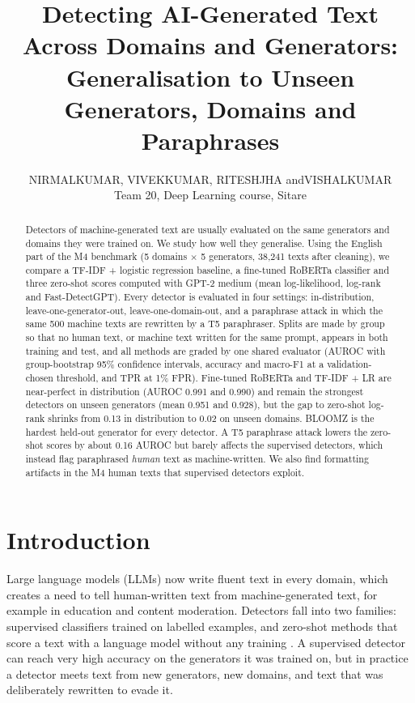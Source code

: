 \documentclass{nle}
\title[Detecting AI-Generated Text Across Domains and Generators]
      {Detecting AI-Generated Text Across Domains and Generators:\\
       Generalisation to Unseen Generators, Domains and Paraphrases}
\author[N.\ Kumar and others]
       {N\ls I\ls R\ls M\ls A\ls L\ns K\ls U\ls M\ls A\ls R,\ns
        V\ls I\ls V\ls E\ls K\ns K\ls U\ls M\ls A\ls R,\ns
        R\ls I\ls T\ls E\ls S\ls H\ns J\ls H\ls A\ns
        and\ns V\ls I\ls S\ls H\ls A\ls L\ns K\ls U\ls M\ls A\ls R\\
        Team 20, Deep Learning course, Sitare}
\begin{document}
\label{firstpage}
\maketitle

\begin{abstract}
Detectors of machine-generated text are usually evaluated on the same generators and domains they were trained on.
We study how well they generalise. Using the English part of the M4 benchmark (5 domains $\times$ 5 generators,
38,241 texts after cleaning), we compare a TF-IDF + logistic regression baseline, a fine-tuned RoBERTa classifier and
three zero-shot scores computed with GPT-2 medium (mean log-likelihood, log-rank and Fast-DetectGPT). Every detector is
evaluated in four settings: in-distribution, leave-one-generator-out, leave-one-domain-out, and a paraphrase attack
in which the same 500 machine texts are rewritten by a T5 paraphraser. Splits are made by group so that no human text,
or machine text written for the same prompt, appears in both training and test, and all methods are graded by one
shared evaluator (AUROC with group-bootstrap 95\% confidence intervals, accuracy and macro-F1 at a validation-chosen
threshold, and TPR at 1\% FPR). Fine-tuned RoBERTa and TF-IDF + LR are near-perfect in distribution (AUROC 0.991 and 0.990) and remain the strongest
detectors on unseen generators (mean 0.951 and 0.928), but the gap to zero-shot log-rank shrinks from 0.13 in
distribution to 0.02 on unseen domains. BLOOMZ is the hardest held-out generator for every detector. A T5 paraphrase
attack lowers the zero-shot scores by about 0.16 AUROC but barely affects the supervised detectors, which instead
flag paraphrased \emph{human} text as machine-written. We also find formatting artifacts in the M4 human texts that
supervised detectors exploit.
\end{abstract}

\section{Introduction}

Large language models (LLMs) now write fluent text in every domain, which creates a need to tell human-written text
from machine-generated text, for example in education and content moderation. Detectors fall into two families:
supervised classifiers trained on labelled examples, and zero-shot methods that score a text with a language model
without any training \cite{mitchell23}. A supervised detector can reach very high accuracy on the generators it was
trained on, but in practice a detector meets text from new generators, new domains, and text that was deliberately
rewritten to evade it.
\end{document}
